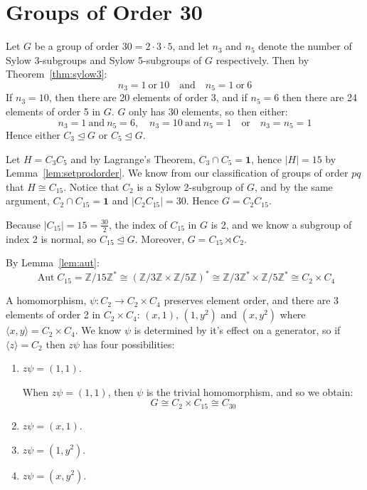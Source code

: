 \documentclass[a4paper, oneside, 12pt, final]{article}
\theoremstyle{definition}
\DeclareMathOperator{\Aut}{Aut}
\newcommand{\Z}{\mathbb{Z}}
\newcommand{\Zn}[1]{\Z/#1\Z}
\begin{document}

\section{Groups of Order 30}
Let \(G\) be a group of order \(30 = 2 \cdot 3 \cdot 5\), and let \(n_3\) and
\(n_5\) denote the number of Sylow 3-subgroups and Sylow 5-subgroups of \(G\)
respectively.
Then by Theorem~\ref{thm:sylow3}:
\[n_3 = 1 \ \text{or} \ 10 \quad \text{and} \quad n_5 = 1 \ \text{or} \ 6\]
If \(n_3 = 10\), then there are 20 elements of order 3, and if \(n_5 = 6\) then
there are 24 elements of order 5 in \(G\).
\(G\) only has 30 elements, so then either:
\[n_3 = 1 \ \text{and} \ n_5 = 6, \quad n_3 = 10 \ \text{and} \ n_5 = 1 \quad \text{or} \quad n_3 = n_5 = 1\]
Hence either \(C_3 \unlhd G\) or \(C_5 \unlhd G\).

Let \(H = C_3C_5\) and by Lagrange's Theorem, \(C_3 \cap C_5 = \bm{1}\), hence
\(|H| = 15\) by Lemma~\ref{lem:setprodorder}.
We know from our classification of groups of order \(pq\) that \(H \cong C_{15}\).
Notice that \(C_2\) is a Sylow 2-subgroup of \(G\), and by the same argument,
\(C_2 \cap C_{15} = \bm{1}\) and \(|C_2C_{15}| = 30\).
Hence \(G = C_2C_{15}\).

Because \(|C_{15}| = 15 = \frac{30}{2}\), the index of \(C_{15}\) in \(G\) is
2, and we know a subgroup of index 2 is normal, so \(C_{15} \unlhd G\).
Moreover, \(G = C_{15} \rtimes C_2\).

By Lemma~\ref{lem:aut}:
\[\Aut{C_{15}} = \Zn{15}^* \cong {(\Zn{3} \times \Zn{5})}^* \cong \Zn{3}^* \times \Zn{5}^* \cong C_2 \times C_4\]

A homomorphism, \(\psi:C_2 \to C_2 \times C_4\) preserves element order, and
there are 3 elements of order 2 in \(C_2 \times C_4\): \((x, 1)\), \((1, y^2)\)
and \((x, y^2)\) where \(\langle x, y \rangle = C_2 \times C_4\).
We know \(\psi\) is determined by it's effect on a generator, so if \(\langle z
\rangle = C_2\) then \(z\psi\) has four possibilities:

\begin{enumerate}
    \item \(z\psi = (1, 1)\).

        When \(z\psi = (1, 1)\), then \(\psi\) is the trivial homomorphism, and
        so we obtain:
        \[G \cong C_2 \times C_{15} \cong C_{30}\]

    \item \(z\psi = (x, 1)\).
    \item \(z\psi = (1, y^2)\).
    \item \(z\psi = (x, y^2)\).
\end{enumerate}
\end{document}
